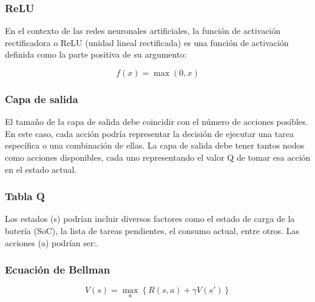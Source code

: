 \documentclass[10pt]{beamer}
\begin{document}
\begin{frame}
  \frametitle{ReLU}
  En el contexto de las redes neuronales artificiales, la función de activación rectificadora o ReLU (unidad lineal rectificada) es una función de activación definida como la parte positiva de su argumento:

  
  \begin{equation}
  f(x) = \max(0, x)
  \end{equation}


\end{frame}

\begin{frame}
  \frametitle{Capa de salida}
  El tamaño de la capa de salida debe coincidir con el número de acciones posibles. En este caso, cada acción podría representar la decisión de ejecutar una tarea específica o una combinación de ellas.
La capa de salida debe tener tantos nodos como acciones disponibles, cada uno representando el valor Q de tomar esa acción en el estado actual.

\end{frame}

\begin{frame}
  \frametitle{Tabla Q}




Los estados (s) podrían incluir diversos factores como el estado de carga de la batería (SoC), la lista de tareas pendientes, el consumo actual, entre otros. Las acciones (a) podrían ser:.
\end{frame}

\begin{frame}
  \frametitle{Ecuación de Bellman}
\begin{equation}
V(s) = \max_a \left\{ R(s, a) + \gamma V(s') \right\}
\end{equation}

\end{frame}
\end{document}
